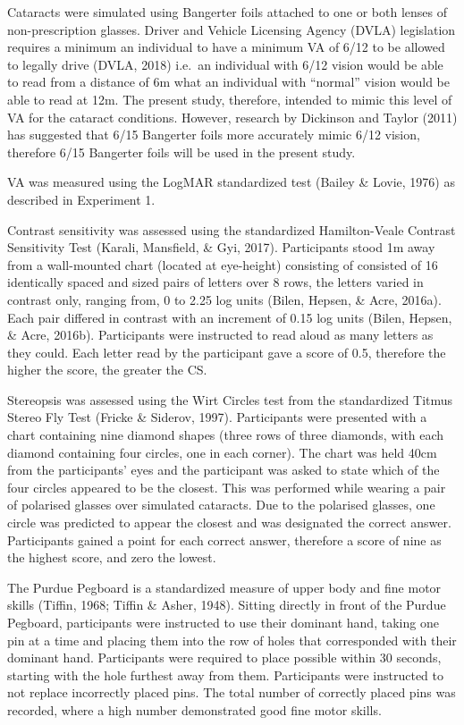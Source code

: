 \documentclass[
  english,
  man,floatsintext]{apa6}
\begin{document}
Cataracts were simulated using Bangerter foils attached to one or both lenses of non-prescription glasses. Driver and Vehicle Licensing Agency (DVLA) legislation requires a minimum an individual to have a minimum VA of 6/12 to be allowed to legally drive (DVLA, 2018) i.e.~an individual with 6/12 vision would be able to read from a distance of 6m what an individual with \enquote{normal} vision would be able to read at 12m. The present study, therefore, intended to mimic this level of VA for the cataract conditions. However, research by Dickinson and Taylor (2011) has suggested that 6/15 Bangerter foils more accurately mimic 6/12 vision, therefore 6/15 Bangerter foils will be used in the present study.

VA was measured using the LogMAR standardized test (Bailey \& Lovie, 1976) as described in Experiment 1.

Contrast sensitivity was assessed using the standardized Hamilton-Veale Contrast Sensitivity Test (Karali, Mansfield, \& Gyi, 2017).
Participants stood 1m away from a wall-mounted chart (located at eye-height) consisting of consisted of 16 identically spaced and sized pairs of letters over 8 rows, the letters varied in contrast only, ranging from, 0 to 2.25 log units (Bilen, Hepsen, \& Acre, 2016a).
Each pair differed in contrast with an increment of 0.15 log units (Bilen, Hepsen, \& Acre, 2016b).
Participants were instructed to read aloud as many letters as they could.
Each letter read by the participant gave a score of 0.5, therefore the higher the score, the greater the CS.

Stereopsis was assessed using the Wirt Circles test from the standardized Titmus Stereo Fly Test (Fricke \& Siderov, 1997).
Participants were presented with a chart containing nine diamond shapes (three rows of three diamonds, with each diamond containing four circles, one in each corner).
The chart was held 40cm from the participants' eyes and the participant was asked to state which of the four circles appeared to be the closest.
This was performed while wearing a pair of polarised glasses over simulated cataracts.
Due to the polarised glasses, one circle was predicted to appear the closest and was designated the correct answer.
Participants gained a point for each correct answer, therefore a score of nine as the highest score, and zero the lowest.

The Purdue Pegboard is a standardized measure of upper body and fine motor skills (Tiffin, 1968; Tiffin \& Asher, 1948).
Sitting directly in front of the Purdue Pegboard, participants were instructed to use their dominant hand, taking one pin at a time and placing them into the row of holes that corresponded with their dominant hand.
Participants were required to place possible within 30 seconds, starting with the hole furthest away from them.
Participants were instructed to not replace incorrectly placed pins.
The total number of correctly placed pins was recorded, where a high number demonstrated good fine motor skills.
\end{document}
